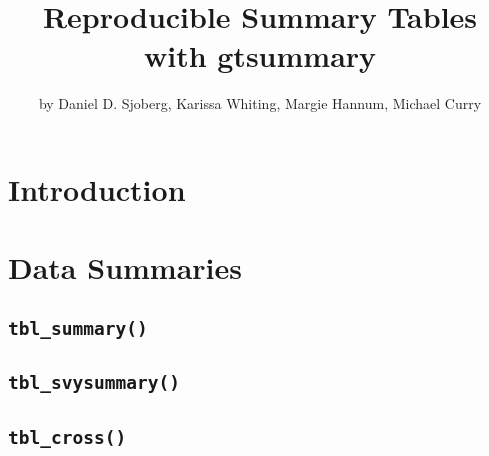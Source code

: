 \title{Reproducible Summary Tables with gtsummary}
\author{by Daniel D. Sjoberg, Karissa Whiting, Margie Hannum, Michael Curry}

\maketitle


\hypertarget{introduction}{%
\section{Introduction}\label{introduction}}

\hypertarget{data-summaries}{%
\section{Data Summaries}\label{data-summaries}}



\hypertarget{tbl_summary}{%
\subsection{\texorpdfstring{\texttt{tbl\_summary()}}{tbl\_summary()}}\label{tbl_summary}}

\begin{Shaded}
\begin{Highlighting}[]
\NormalTok{ <{-}}
\StringTok{  }\OperatorTok{\%>\%}
\StringTok{  }\OperatorTok{\%>\%}
\StringTok{  }\NormalTok{(}
\end{Highlighting}
\end{Shaded}

\hypertarget{tbl_svysummary}{%
\subsection{\texorpdfstring{\texttt{tbl\_svysummary()}}{tbl\_svysummary()}}\label{tbl_svysummary}}

\hypertarget{tbl_cross}{%
\subsection{\texorpdfstring{\texttt{tbl\_cross()}}{tbl\_cross()}}\label{tbl_cross}}


